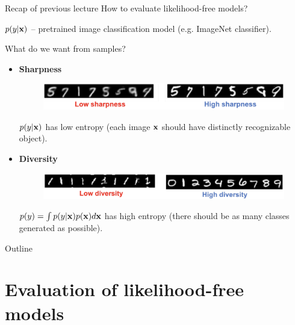 \begin{frame}{Recap of previous lecture}
	How to evaluate likelihood-free models?
	
	$p(y | \mathbf{x})$ -- pretrained image classification model (e.g. ImageNet classifier).
	\begin{block}{What do we want from samples?}
		\begin{itemize}
			\item \textbf{Sharpness}
			\begin{figure}
				\centering
				\includegraphics[width=0.9\linewidth]{figs/sharpness}
			\end{figure}
			$p(y | \mathbf{x})$ has low entropy (each image $\mathbf{x}$ should have distinctly recognizable object).
			\item \textbf{Diversity}
			\begin{figure}
				\centering
				\includegraphics[width=0.9\linewidth]{figs/diversity}
			\end{figure}
			$p(y) = \int p(y | \mathbf{x}) p(\mathbf{x}) d \mathbf{x}$ has high entropy (there should be as many classes generated as possible).
		\end{itemize}
	\end{block}
\end{frame}
\begin{frame}{Outline}
	\tableofcontents
\end{frame}
\section{Evaluation of likelihood-free models}

